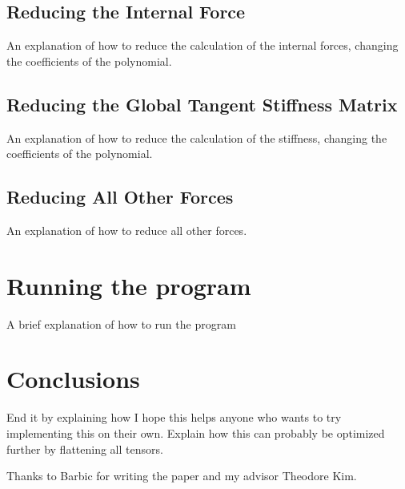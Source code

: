 \documentclass[twocolumn,10pt]{asme2ej}
\begin{document}
\subsection{Reducing the Internal Force}

An explanation of how to reduce the calculation of the internal forces, changing the coefficients
of the polynomial.

\subsection{Reducing the Global Tangent Stiffness Matrix}

An explanation of how to reduce the calculation of the stiffness, changing the coefficients
of the polynomial.

\subsection{Reducing All Other Forces}

An explanation of how to reduce all other forces.

\section{Running the program}

A brief explanation of how to run the program

\section{Conclusions}

End it by explaining how I hope this helps anyone who wants to try implementing this on their own.
Explain how this can probably be optimized further by flattening all tensors.

\begin{acknowledgment}

Thanks to Barbic for writing the paper and my advisor Theodore Kim.

\end{acknowledgment}

\end{document}
